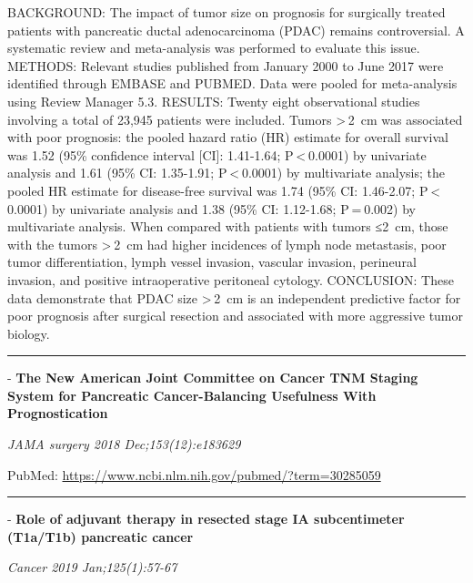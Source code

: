 \documentclass[]{article}
\begin{document}
BACKGROUND: The impact of tumor size on prognosis for surgically treated
patients with pancreatic ductal adenocarcinoma (PDAC) remains
controversial. A systematic review and meta-analysis was performed to
evaluate this issue. METHODS: Relevant studies published from January
2000 to June 2017 were identified through EMBASE and PUBMED. Data were
pooled for meta-analysis using Review Manager 5.3. RESULTS: Twenty eight
observational studies involving a total of 23,945 patients were
included. Tumors \textgreater{} 2~cm was associated with poor prognosis:
the pooled hazard ratio (HR) estimate for overall survival was 1.52
(95\% confidence interval {[}CI{]}: 1.41-1.64; P \textless{} 0.0001) by
univariate analysis and 1.61 (95\% CI: 1.35-1.91; P \textless{} 0.0001)
by multivariate analysis; the pooled HR estimate for disease-free
survival was 1.74 (95\% CI: 1.46-2.07; P \textless{} 0.0001) by
univariate analysis and 1.38 (95\% CI: 1.12-1.68; P = 0.002) by
multivariate analysis. When compared with patients with tumors ≤2~cm,
those with the tumors \textgreater{} 2~cm had higher incidences of lymph
node metastasis, poor tumor differentiation, lymph vessel invasion,
vascular invasion, perineural invasion, and positive intraoperative
peritoneal cytology. CONCLUSION: These data demonstrate that PDAC size
\textgreater{} 2~cm is an independent predictive factor for poor
prognosis after surgical resection and associated with more aggressive
tumor biology.

{}

{}

\begin{center}\rule{0.5\linewidth}{\linethickness}\end{center}

 - \textbf{The New American Joint Committee on Cancer TNM Staging System
for Pancreatic Cancer-Balancing Usefulness With Prognostication}

\emph{JAMA surgery 2018 Dec;153(12):e183629}

PubMed: \url{https://www.ncbi.nlm.nih.gov/pubmed/?term=30285059}

{}

{}

\begin{center}\rule{0.5\linewidth}{\linethickness}\end{center}

 - \textbf{Role of adjuvant therapy in resected stage IA subcentimeter
(T1a/T1b) pancreatic cancer}

\emph{Cancer 2019 Jan;125(1):57-67}
\end{document}

